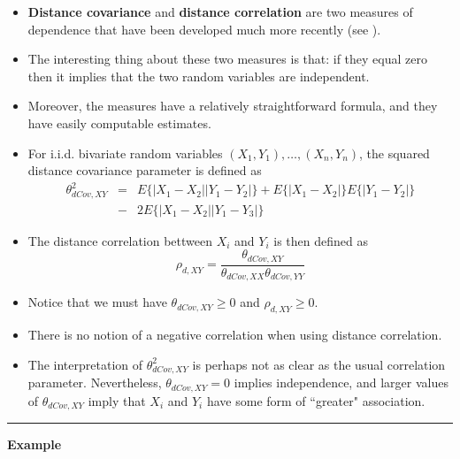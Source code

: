 \documentclass[]{book}
\begin{document}
\begin{itemize}
\item
  \textbf{Distance covariance} and \textbf{distance correlation} are two measures of dependence that have been developed
  much more recently (see \citet{szekely2007}).
\item
  The interesting thing about these two measures is that: if they equal zero then it
  implies that the two random variables are independent.
\item
  Moreover, the measures have a relatively straightforward formula, and
  they have easily computable estimates.
\item
  For i.i.d. bivariate random variables \((X_{1}, Y_{1}), \ldots, (X_{n}, Y_{n})\),
  the squared distance covariance parameter is defined as
  \begin{eqnarray}
  \theta_{dCov,XY}^{2} 
  &=& E\Big\{ |X_{1} - X_{2}| |Y_{1} - Y_{2}|  \Big\} + E\Big\{ |X_{1} - X_{2}| \Big\}E\Big\{ |Y_{1} - Y_{2}| \Big\} \nonumber \\
  &-& 2E\Big\{ |X_{1} - X_{2}||Y_{1} - Y_{3}| \Big\} \nonumber
  \end{eqnarray}
\item
  The distance correlation bettween \(X_{i}\) and \(Y_{i}\) is then defined as
  \begin{equation}
  \rho_{d, XY} = \frac{ \theta_{dCov,XY} }{\theta_{dCov,XX} \theta_{dCov, YY} }  \nonumber
  \end{equation}
\item
  Notice that we must have \(\theta_{dCov, XY} \geq 0\) and \(\rho_{d, XY} \geq 0\).
\item
  There is no notion of a negative correlation when using distance correlation.
\item
  The interpretation of \(\theta_{dCov,XY}^{2}\) is perhaps not as clear as
  the usual correlation parameter. Nevertheless, \(\theta_{dCov,XY} = 0\)
  implies independence, and larger values of \(\theta_{dCov,XY}\) imply
  that \(X_{i}\) and \(Y_{i}\) have some form of ``greater" association.
\end{itemize}

\begin{center}\rule{0.5\linewidth}{\linethickness}\end{center}

\textbf{Example}
\end{document}

